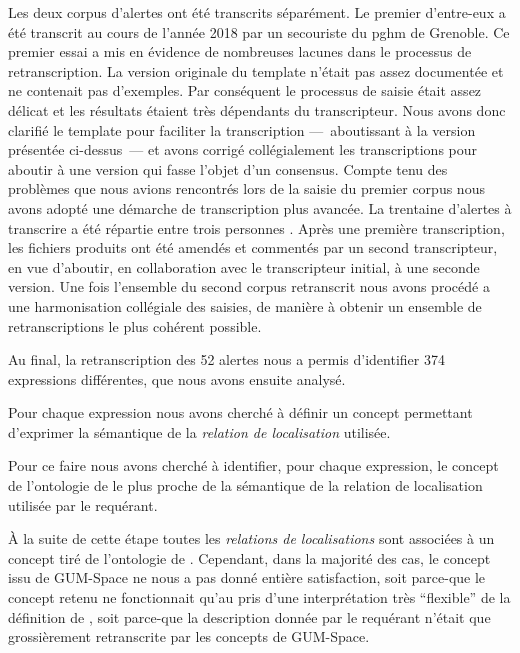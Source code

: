 Les deux corpus d'alertes ont été transcrits séparément. Le premier
d'entre-eux a été transcrit au cours de l'année 2018 par un secouriste
du \ac{pghm} de Grenoble. Ce premier essai a mis en évidence de
nombreuses lacunes dans le processus de retranscription. La version
originale du template n'était pas assez documentée et ne contenait pas
d'exemples. Par conséquent le processus de saisie était assez délicat
et les résultats étaient très dépendants du transcripteur. Nous avons
donc clarifié le template pour faciliter la transcription
---~aboutissant à la version présentée ci-dessus~--- et avons corrigé
collégialement les transcriptions pour aboutir à une version qui fasse
l'objet d'un consensus. Compte tenu des problèmes que nous avions
rencontrés lors de la saisie du premier corpus nous avons adopté une
démarche de transcription plus avancée. La trentaine d'alertes à
transcrire a été répartie entre trois  personnes
\autocite{Bunel2019}. Après une première transcription, les fichiers
produits ont été amendés et commentés par un second transcripteur, en
vue d'aboutir, en collaboration avec le transcripteur initial, à une
seconde version. Une fois l'ensemble du second corpus retranscrit nous
avons procédé a une harmonisation collégiale des saisies, de manière à
obtenir un ensemble de retranscriptions le plus cohérent possible.

Au final, la retranscription des 52 alertes nous a permis d'identifier
374 expressions différentes, que nous avons ensuite analysé.

Pour chaque expression nous avons cherché à définir un concept
permettant d'exprimer la sémantique de la \emph{relation de
  localisation} utilisée.

Pour ce faire nous avons cherché à
identifier, pour chaque expression, le concept de l'ontologie de
\textcite{Bateman2010} le plus proche de la sémantique de la relation
de localisation utilisée par le requérant.

À la suite de cette étape toutes les \emph{relations de localisations}
sont associées à un concept tiré de l'ontologie de
\textcite{Bateman2010}. Cependant, dans la majorité des cas, le
concept issu de GUM-Space ne nous a pas donné entière satisfaction,
soit parce-que le concept retenu ne fonctionnait qu'au pris d'une
interprétation très \enquote{flexible} de la définition de
\textcite{Bateman2010}, soit parce-que la description donnée par le
requérant n'était que grossièrement retranscrite par les concepts de
GUM-Space.


